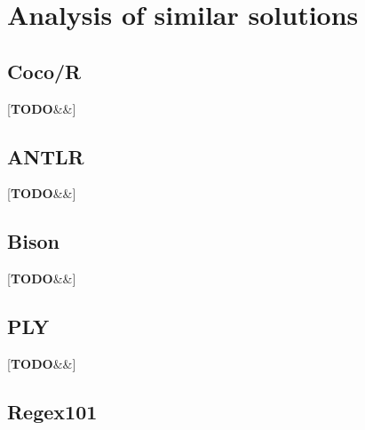\documentclass[english,engineering]{wizthesis}
\newcommand{\todo}[1]{%
  {\color{red}[\textbf{TODO}\ifx&#1&{}\else{ }\fi\textit{#1}]}%
}
\begin{document}



\chapter{Analysis of similar solutions}

\section*{Coco/R}

\todo{\cite{coco/r}}

\section*{ANTLR}

\todo{\cite{antlr}}

\section*{Bison}

\todo{\cite{bison}}

\section*{PLY}

\todo{\cite{ply}}

\section*{Regex101}
\end{document}

